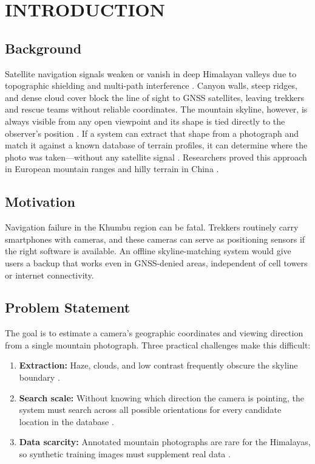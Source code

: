 \chapter{INTRODUCTION}

\section{Background}
Satellite navigation signals weaken or vanish in deep Himalayan valleys due to topographic shielding and multi-path interference \cite{pan2020camera, Steger2022}. Canyon walls, steep ridges, and dense cloud cover block the line of sight to GNSS satellites, leaving trekkers and rescue teams without reliable coordinates. The mountain skyline, however, is always visible from any open viewpoint and its shape is tied directly to the observer's position \cite{pan2020camera}. If a system can extract that shape from a photograph and match it against a known database of terrain profiles, it can determine where the photo was taken---without any satellite signal \cite{Steger2022, pan2020camera}. Researchers proved this approach in European mountain ranges \cite{baatz2012large, saurer2016image} and hilly terrain in China \cite{pan2020camera}.

\section{Motivation}
Navigation failure in the Khumbu region can be fatal. Trekkers routinely carry smartphones with cameras, and these cameras can serve as positioning sensors if the right software is available. An offline skyline-matching system would give users a backup that works even in GNSS-denied areas, independent of cell towers or internet connectivity.

\section{Problem Statement}
The goal is to estimate a camera's geographic coordinates and viewing direction from a single mountain photograph. Three practical challenges make this difficult:
\begin{enumerate}
\item \textbf{Extraction:} Haze, clouds, and low contrast frequently obscure the skyline boundary \cite{Yang2025}.
\item \textbf{Search scale:} Without knowing which direction the camera is pointing, the system must search across all possible orientations for every candidate location in the database \cite{pan2020camera}.
\item \textbf{Data scarcity:} Annotated mountain photographs are rare for the Himalayas, so synthetic training images must supplement real data \cite{Brejcha2017}.
\end{enumerate}

